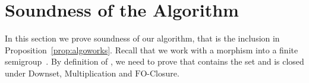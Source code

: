 \documentclass{CSML}
\newcommand{\fo}{\ensuremath{\text{FO}}\xspace}
\theoremstyle{plain}
\newtheorem{theorem}[thm]{Theorem}
\newtheorem{corollary}[thm]{Corollary}
\begin{document}
\begin{comment}

  \subsection{Main Theorem}

  We can now state our main theorem. As we explained before it contains
  two results. First we provide a bound on the expected size of an
  \fo-separator. Second, we prove that \fo-separability corresponds
  exactly to having empty \fo-intersection.

  \begin{theorem} \label{th:fosep}
    Let  be regular languages and let  be their
    syntactic semigroups. Let . Then the following
    conditions are equivalent:

    \begin{enumerate}
    \item\label{item:a}  and  are \fo-separable.
    \item\label{item:b}  and  are -separable.
    \item\label{item:c} The language  separates
       from .
    \item\label{item:d}  have empty \fo-intersection.
    \end{enumerate}
  \end{theorem}

  Observe that in particular, Theorem~\ref{th:fosep} yields two
  algorithms for testing \fo-separability. From items~\ref{item:b}
  and~\ref{item:c}, we get a brute-force algorithm that tests for
  all the finitely many  languages whether they are a
  separator. From item~\ref{item:d}, we get a second algorithm given
  by Proposition~\ref{prop:algosep}. Therefore, we get the
  following corollary.

  \begin{corollary} \label{cor:fosep}
    Let  be regular languages, it is decidable to test whether
    they are \fo-separable. Moreover this can be done in {\sc Exptime}
    in the size of their syntactic semigroups.
  \end{corollary}
\end{comment}

\section{Soundness of the Algorithm}
\label{sec:correc}
In this section we prove soundness of our algorithm, that is the
inclusion  in
Proposition~\ref{prop:algoworks}. Recall that we work with a morphism
 into a finite semigroup~. By definition of , we need to
prove that  contains the set  and is closed under Downset, Multiplication and
\fo-Closure.
\end{document}
